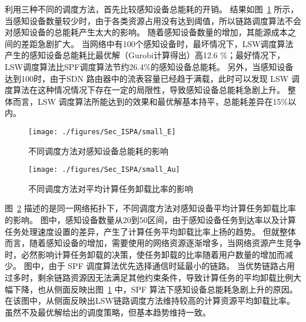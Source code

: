 利用三种不同的调度方法，首先比较感知设备总能耗的开销。
结果如图~\ref{fig_smallE} 所示，当感知设备数量较少时，由于各类资源占用没有达到阈值，所以链路调度算法不会对感知设备的总能耗产生太大的影响。
随着感知设备数量的增加，其能源成本之间的差距急剧扩大。
当网络中有100个感知设备时，最坏情况下，LSW调度算法产生的感知设备总能耗比最优解（Gurobi计算得出）高12.6 \%；最好情况下，LSW调度算法比SPF调度算法节约26.4\%的感知设备总能耗。
另外，当感知设备达到100时，由于SDN 路由器中的流表容量已经趋于满载，此时可以发现 LSW 调度算法在这种情况情况下存在一定的局限性，导致感知设备总能耗急剧上升。
整体而言，LSW 调度算法所能达到的效果和最优解基本持平，总能耗差异在15\%以内。

\begin{figure}[!t]
  \centering
  \texttt{[image: ./figures/Sec\_ISPA/small\_E]}
  \vspace{-1em}
  \caption{不同调度方法对感知设备总能耗的影响}
  \label{fig_smallE}
\end{figure}


\begin{figure}[!h]
  \centering
  \texttt{[image: ./figures/Sec\_ISPA/small\_Au]}
  \vspace{-0.5em}
  \caption{不同调度方法对平均计算任务卸载比率的影响}
  \vspace{-0.5em}
  \label{fig_smallAu}
\end{figure}

图~\ref{fig_smallAu} 描述的是同一网络拓扑下，不同调度方法对感知设备平均计算任务卸载比率的影响。
图中，感知设备数量从20到50区间，由于感知设备任务到达率以及计算任务处理速度设置的差异，产生了计算任务平均卸载比率上扬的趋势。
但就整体而言，随着感知设备的增加，需要使用的网络资源逐渐增多，当网络资源产生竞争时，必然影响计算任务卸载的决策，使任务卸载的比率随着用户数量的增加而减少。
图中，由于 SPF 调度算法优先选择通信时延最小的链路。
当优势链路占用过多时，剩余链路资源因无法满足其他约束条件，导致计算任务的平均卸载比例大幅下降，也从侧面反映出图~\ref{fig_smallE} 中，SPF 算法下感知设备总能耗急剧上升的原因。
在该图中，从侧面反映出LSW链路调度方法维持较高的计算资源平均卸载比率。
虽然不及最优解给出的调度策略，但基本趋势维持一致。

